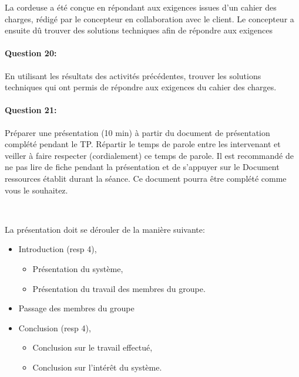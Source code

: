 La cordeuse a été conçue en répondant aux exigences issues d'un cahier des charges, rédigé par le concepteur en collaboration avec le client. Le concepteur a ensuite dû trouver des solutions techniques afin de répondre aux exigences 

\paragraph{Question 20:} En utilisant les résultats des activités précédentes, trouver les solutions techniques qui ont permis de répondre aux exigences du cahier des charges.


\paragraph{Question 21:} Préparer une présentation (10 min) à partir du document de présentation complété pendant le TP. Répartir le temps de parole entre les intervenant et veiller à faire respecter (cordialement) ce temps de parole. Il est recommandé de ne pas lire de fiche pendant la présentation et de s'appuyer sur le \og Document ressources \fg établit durant la séance. Ce document pourra être complété comme vous le souhaitez.

~\

La présentation doit se dérouler de la manière suivante:
\begin{itemize}
 \item Introduction (resp 4),
 \begin{itemize}
 \item Présentation du système,
 \item Présentation du travail des membres du groupe.
 \end{itemize}
 \item Passage des membres du groupe
 \item Conclusion (resp 4),
 \begin{itemize}
 \item Conclusion sur le travail effectué,
 \item Conclusion sur l'intérêt du système.
 \end{itemize}
\end{itemize}




